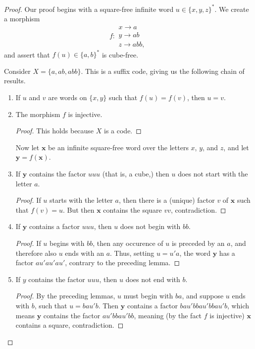 \documentclass[letterpaper,12pt]{article}
\newcommand{\bl}[1]{\mathbf{#1}}
\begin{document}
\begin{proof}

Our proof begins with a square-free infinite word $u \in \{x, y, z\}^*$. We create a morphism
\[
	f :
	\begin{array}{l}
		x \rightarrow a \\
		y \rightarrow ab \\
		z \rightarrow abb,
	\end{array}
\]
and assert that $f(u) \in \{a, b\}^*$ is cube-free.

Consider $X = \{a, ab, abb\}$. This is a suffix code, giving us the following chain of results.

\begin{enumerate}
\item If $u$ and $v$ are words on $\{x, y\}$ such that $f(u) = f(v)$, then $u = v$.

\item The morphism $f$ is injective.

\begin{proof}
This holds because $X$ is a code.
\end{proof}

Now let $\bl{x}$ be an infinite square-free word over the letters $x$, $y$, and $z$, and let $\bl{y} = f(\bl{x})$.

\item If $\bl{y}$ contains the factor $uuu$ (that is, a cube,) then $u$ does not start with the letter $a$.

\begin{proof}
If $u$ starts with the letter $a$, then there is a (unique) factor $v$ of $\bl{x}$ such that $f(v)=u$. But then $\bl{x}$ contains the square $vv$, contradiction.
\end{proof}

\item If $\bl{y}$ contains a factor $uuu$, then $u$ does not begin with $bb$. 

\begin{proof}
	If $u$ begins with $bb$, then any occurence of $u$ is preceded by an $a$, and therefore also $u$ ends with an $a$. Thus, setting $u = u'a$, the word $\bl{y}$ has a factor $au'au'au'$, contrary to the preceding lemma.
\end{proof}

\item If $y$ contains the factor $uuu$, then $u$ does not end with $b$.

\begin{proof}
	By the preceding lemmas, $u$ must begin with $ba$, and suppose $u$ ends with $b$, such that $u = bau'b$. Then $\bl{y}$ contains a factor $bau'bbau'bbau'b$, which means $\bl{y}$ contains the factor $au'bbau'bb$, meaning (by the fact $f$ is injective) $\bl{x}$ contains a square, contradiction.
\end{proof}
\end{enumerate}


\end{proof}
\end{document}
